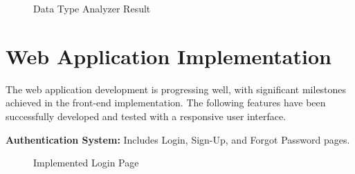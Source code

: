 \documentclass[12pt,oneside,openright,a4paper]{cpe-english-project}
\begin{document}
\begin{figure}[H]
\centering
{}
\caption{Data Type Analyzer Result}\label{fig:datatype-result}
\end{figure}


\section{Web Application Implementation}

The web application development is progressing well, with significant milestones achieved in the front-end implementation. The following features have been successfully developed and tested with a responsive user interface.

\textbf{Authentication System:} Includes Login, Sign-Up, and Forgot Password pages.

\begin{figure}[H]
\centering
{}
\caption{Implemented Login Page}\label{fig:auth-login}
\end{figure}
\end{document}
